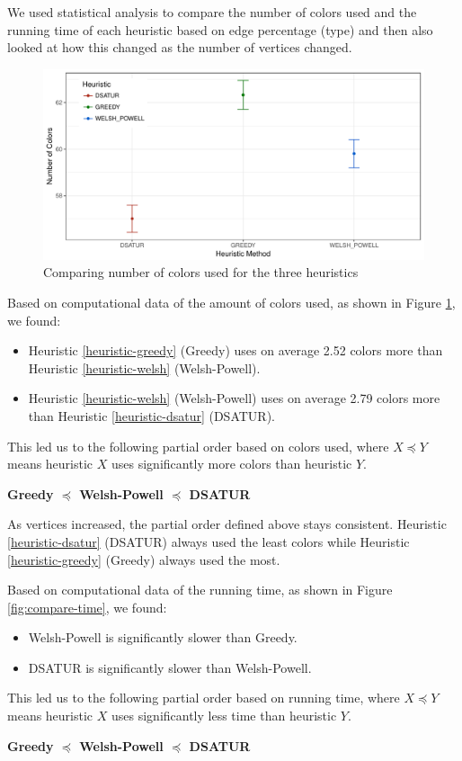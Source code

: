 \documentclass{article}
\newcounter{heuristic} \setcounter{heuristic}{0}
\theoremstyle{definition}
\begin{document}
We used statistical analysis to compare the number of colors used and the running time of each heuristic based on edge percentage (type) and then also looked at how this changed as the number of vertices changed.

\begin{figure}[H]
  \includegraphics[width=\linewidth]{../poster/figures/plot-colors.pdf}
  \caption{Comparing number of colors used for the three heuristics}\label{fig:compare-colors}
\end{figure}

Based on computational data of the amount of colors used, as shown in Figure \ref{fig:compare-colors}, we found:
\begin{itemize}
  \item Heuristic \ref{heuristic-greedy} (Greedy) uses on average 2.52 colors more than Heuristic \ref{heuristic-welsh} (Welsh-Powell).
  \item Heuristic \ref{heuristic-welsh} (Welsh-Powell) uses on average 2.79 colors more than Heuristic \ref{heuristic-dsatur} (DSATUR).
\end{itemize}
This led us to the following partial order based on colors used, where $X \preceq Y$ means heuristic $X$ uses significantly more colors than heuristic $Y$.
\begin{center}
  \textbf{Greedy $\preceq$ Welsh-Powell $\preceq$ DSATUR}
\end{center}
As vertices increased, the partial order defined above stays consistent. Heuristic \ref{heuristic-dsatur} (DSATUR) always used the least colors while Heuristic \ref{heuristic-greedy} (Greedy) always used the most.

Based on computational data of the running time, as shown in Figure \ref{fig:compare-time}, we found:
\begin{itemize}
  \item Welsh-Powell is significantly slower than Greedy.
  \item DSATUR is significantly slower than Welsh-Powell.
\end{itemize}
This led us to the following partial order based on running time, where $X \preceq Y$ means heuristic $X$ uses significantly less time than heuristic $Y$.
\begin{center}
  \textbf{Greedy $\preceq$ Welsh-Powell $\preceq$ DSATUR}
\end{center}
\end{document}
